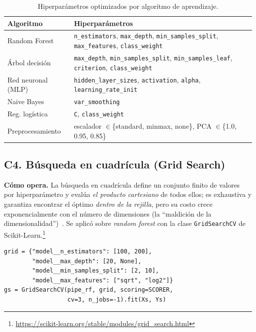 \documentclass[11pt,a4paper,twocolumn]{article}
\begin{document}
\begin{table}[H]
\centering
\caption{Hiperparámetros optimizados por algoritmo de aprendizaje.}
\label{tab:hp}
\scriptsize
\begin{tabularx}{\columnwidth}{lX}
\toprule
\textbf{Algoritmo} & \textbf{Hiperparámetros} \\
\midrule
Random Forest & \texttt{n\_estimators}, \texttt{max\_depth}, \texttt{min\_samples\_split}, \texttt{max\_features}, \texttt{class\_weight} \\
Árbol decisión & \texttt{max\_depth}, \texttt{min\_samples\_split}, \texttt{min\_samples\_leaf}, \texttt{criterion}, \texttt{class\_weight} \\
Red neuronal (MLP) & \texttt{hidden\_layer\_sizes}, \texttt{activation}, \texttt{alpha}, \texttt{learning\_rate\_init} \\
Naive Bayes & \texttt{var\_smoothing} \\
Reg. logística & \texttt{C}, \texttt{class\_weight} \\
\midrule
Preprocesamiento & escalador $\in$\{standard, minmax, none\}, PCA $\in$\{1.0, 0.95, 0.85\} \\
\bottomrule
\end{tabularx}
\end{table}

\subsection{C4. Búsqueda en cuadrícula (Grid Search)}
\label{sec:c4}
\textbf{Cómo opera.} La búsqueda en cuadrícula define un conjunto finito de valores por hiperparámetro y
evalúa \emph{el producto cartesiano} de todos ellos; es exhaustiva y garantiza encontrar el óptimo
\emph{dentro de la rejilla}, pero su costo crece exponencialmente con el número de dimensiones (la
``maldición de la dimensionalidad'')~\cite{bergstra2012}. Se aplicó sobre \textit{random forest} con la clase
\texttt{GridSearchCV} de Scikit-Learn.\footnote{\scriptsize\url{https://scikit-learn.org/stable/modules/grid_search.html}}

\begin{lstlisting}[caption={C4 -- Grid Search exhaustivo con validación cruzada}]
grid = {"model__n_estimators": [100, 200],
        "model__max_depth": [20, None],
        "model__min_samples_split": [2, 10],
        "model__max_features": ["sqrt", "log2"]}
gs = GridSearchCV(pipe_rf, grid, scoring=SCORER,
                  cv=3, n_jobs=-1).fit(Xs, Ys)
\end{lstlisting}
\end{document}
